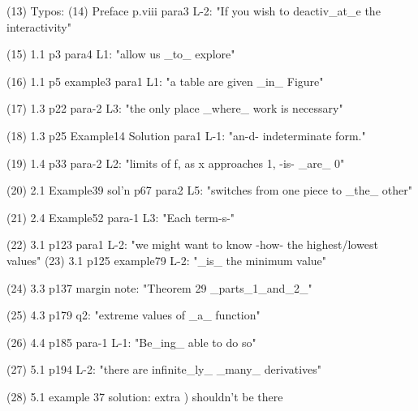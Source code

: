 (13)  Typos:
(14)  Preface p.viii para3 L-2: "If you wish to deactiv_at_e the interactivity"

(15)  1.1 p3 para4 L1: "allow us _to_ explore"

(16)  1.1 p5 example3 para1 L1: "a table are given _in_ Figure"

(17)  1.3 p22 para-2 L3: "the only place _where_ work is necessary"

(18)  1.3 p25 Example14 Solution para1 L-1: "an-d- indeterminate form."

(19)  1.4 p33 para-2 L2: "limits of f, as x approaches 1, -is- _are_ 0"

(20)  2.1 Example39 sol'n p67 para2 L5: "switches from one piece to _the_ other"

(21)  2.4 Example52 para-1 L3: "Each term-s-"

(22)  3.1 p123 para1 L-2: "we might want to know -how- the highest/lowest values"
(23)  3.1 p125 example79 L-2: "_is_ the minimum value"

(24)  3.3 p137 margin note: "Theorem 29 _parts_1_and_2_"

(25)  4.3 p179 q2: "extreme values of _a_ function"

(26)  4.4 p185 para-1 L-1: "Be_ing_ able to do so"

(27)  5.1 p194 L-2: "there are infinite_ly_ _many_ derivatives"

(28)  5.1 example 37 solution: extra ) shouldn't be there


